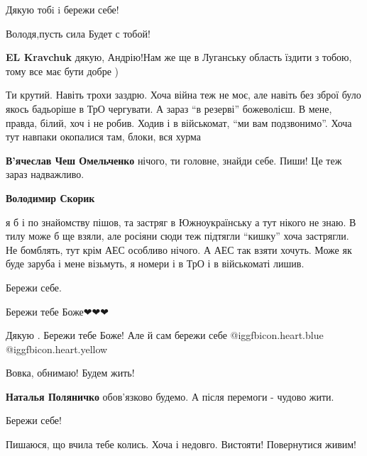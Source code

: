  
 
 
 
 
\zzSecCmt

\begin{itemize} %
Дякую тобi i бережи себе!

Володя,пусть сила Будет с тобой!

\textbf{EL Kravchuk} дякую, Андрію!Нам же ще в Луганську область їздити з тобою, тому все має бути добре )


Ти крутий. Навіть трохи заздрю. Хоча війна теж не моє, але навіть без зброї
було якось бадьоріше в ТрО чергувати. А зараз \enquote{в резерві} божеволієш. В мене,
правда, білий, хоч і не робив. Ходив і в військомат, \enquote{ми вам подзвонимо}. Хоча
тут навпаки окопалися там, блоки, вся хурма

\textbf{В'ячеслав Чеш Омельченко} нічого, ти головне, знайди себе. Пиши! Це теж зараз надважливо.

\textbf{Володимир Скорик} 

я б і по знайомству пішов, та застряг в Южноукраїнську а тут нікого не знаю. В
тилу може б ще взяли, але росіяни сюди теж підтягли \enquote{кишку} хоча застрягли. Не
бомблять, тут крім АЕС особливо нічого. А АЕС так взяти хочуть. Може як буде
заруба і мене візьмуть, я номери і в ТрО і в військоматі лишив.

Бережи себе.

Бережи тебе Боже❤❤❤

Дякую . Бережи тебе Боже! Але й сам бережи себе @igg{fbicon.heart.blue}  @igg{fbicon.heart.yellow} 

Вовка, обнимаю!
Будем жить!

\textbf{Наталья Поляничко} обов'язково будемо. А після перемоги - чудово жити.

Бережи себе!

Пишаюся, що вчила тебе колись.
Хоча і недовго.
Вистояти! Повернутися живим!


\end{itemize}
